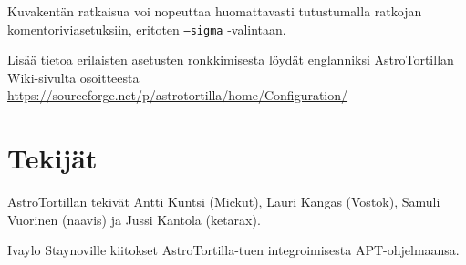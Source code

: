 \documentclass{article}
\newcommand{\surl}[1]{{\small \url{#1}}}
\begin{document}
Kuvakentän ratkaisua voi nopeuttaa huomattavasti tutustumalla ratkojan komentoriviasetuksiin, eritoten \texttt{--sigma} -valintaan.

Lisää tietoa erilaisten asetusten ronkkimisesta löydät englanniksi AstroTortillan Wiki-sivulta osoitteesta \surl{https://sourceforge.net/p/astrotortilla/home/Configuration/}

\section{Tekijät}

AstroTortillan tekivät Antti Kuntsi (Mickut), Lauri Kangas (Vostok), Samuli Vuorinen (naavis) ja Jussi Kantola (ketarax).

Ivaylo Staynoville kiitokset AstroTortilla-tuen integroimisesta APT-ohjelmaansa.
\end{document}

